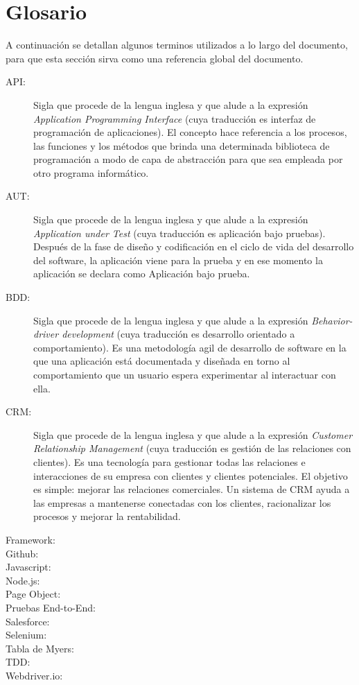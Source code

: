 \chapter{Glosario}\label{appendix_glossary}
A continuación se detallan algunos terminos utilizados a lo largo del
documento, para que esta sección sirva como una referencia global del documento.

\begin{description}
\item [API:] Sigla que procede de la lengua inglesa y que alude a la expresión
    \emph{Application Programming Interface} (cuya traducción es interfaz de
    programación de aplicaciones). El concepto hace referencia a los procesos,
    las funciones y los métodos que brinda una determinada biblioteca de
    programación a modo de capa de abstracción para que sea empleada por otro
    programa informático.
\item [AUT:] Sigla que procede de la lengua inglesa y que alude a la expresión
    \emph{Application under Test} (cuya traducción es aplicación bajo pruebas).
    Después de la fase de diseño y codificación en el ciclo de vida del
    desarrollo del software, la aplicación viene para la prueba y en ese momento
    la aplicación se declara como Aplicación bajo prueba.
\item [BDD:] Sigla que procede de la lengua inglesa y que alude a la expresión
    \emph{Behavior-driver development} (cuya traducción es desarrollo orientado
    a comportamiento). Es una metodología agil de desarrollo de software en la
    que una aplicación está documentada y diseñada en torno al comportamiento
    que un usuario espera experimentar al interactuar con ella.
\item [CRM:] Sigla que procede de la lengua inglesa y que alude a la expresión
    \emph{Customer Relationship Management} (cuya traducción es gestión de las
    relaciones con clientes). Es una tecnología para gestionar todas las
    relaciones e interacciones de su empresa con clientes y clientes
    potenciales. El objetivo es simple: mejorar las relaciones comerciales. Un
    sistema de CRM ayuda a las empresas a mantenerse conectadas con los
    clientes, racionalizar los procesos y mejorar la rentabilidad.
\item [Framework:]
\item [Github:]
\item [Javascript:]
\item [Node.js:]
\item [Page Object:]
\item [Pruebas End-to-End:]
\item [Salesforce:]
\item [Selenium:]
\item [Tabla de Myers:]
\item [TDD:]
\item [Webdriver.io:]
\end{description}

